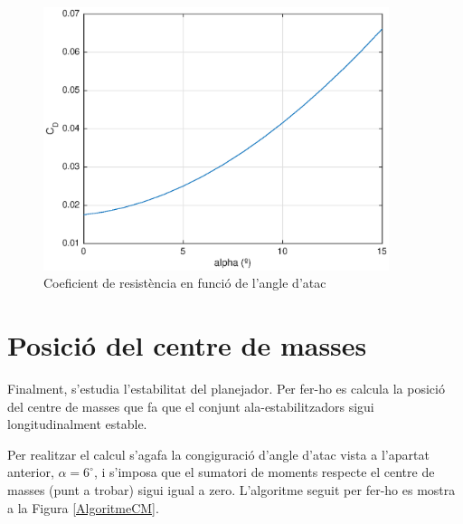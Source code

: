 \begin{figure}[h]
	\centering
	\includegraphics[width=0.9\textwidth]{./plots/CDvsalpha_4}
	\caption{Coeficient de resistència en funció de l'angle d'atac}
	\label{CDvsalpha}
\end{figure}


 
\section{Posició del centre de masses} 

Finalment, s'estudia l'estabilitat del planejador. Per fer-ho es calcula la posició del centre de masses que fa que el conjunt ala-estabilitzadors sigui longitudinalment estable. 

Per realitzar el calcul s'agafa la congiguració d'angle d'atac vista a l'apartat anterior, $\alpha=6^{\circ}$, i s'imposa que el sumatori de moments respecte el centre de masses (punt a trobar) sigui igual a zero. L'algoritme seguit per fer-ho es mostra a la Figura \ref{AlgoritmeCM}.

